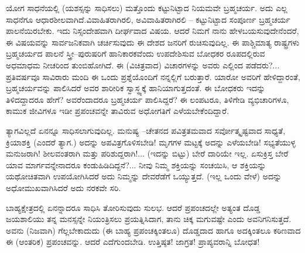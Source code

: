 ಯೋಗ ಸಾಧನೆಯಲ್ಲಿ (ಯಶಸ್ಸನ್ನು ಸಾಧಿಸಲು) ಮತ್ತೊಂದು ಕಟ್ಟುನಿಟ್ಟಾದ ನಿಯಮವೇ ಬ್ರಹ್ಮಚರ್ಯ. ಅದು ಎಲ್ಲ ಸಾಧನೆಗೂ ಆಧಾರಶೀಲವಾಗಿದೆ.\break ವಿವಾಹಿತರಾಗಿರಲಿ, ಅವಿವಾಹಿತರಾಗಿರಲಿ – ಕಟ್ಟುನಿಟ್ಟಾದ ಸಂಪೂರ್ಣ ಬ್ರಹ್ಮಚರ್ಯ ಪಾಲನೆಯಿರಬೇಕು. ಇದು ನಿಸ್ಸಂದೇಹವಾಗಿ ದೀರ್ಘವಾದ ವಿಷಯ. ಆದರೆ ನಿಮಗೆ ನಾನು ಹೇಳಬಯಸುವುದೇನೆಂದರೆ, ಈ ವಿಷಯವನ್ನು ಸಾರ್ವಜನಿಕವಾಗಿ ಚರ್ಚಿಸುವುದು ಈ ದೇಶದ ಜನರಿಗೆ ರುಚಿಸುವುದಿಲ್ಲ. ಈ ಪಾಶ್ಚಿಮಾತ್ಯ ರಾಷ್ಟ್ರಗಳು ಬ್ರಹ್ಮಚರ್ಯದ ಪಾಲನೆ ಸ್ತ್ರೀ–ಪುರುಷರಿಗೆ ಹಾನಿಕಾರಕವೆಂದು ಉಪದೇಶಿಸುವ ಬೋಧಕರ ರೂಪದಲ್ಲಿರುವ ಅಧಮಾಧಮ ನೀಚರಿಂದ ತುಂಬಿಹೋಗಿದೆ. ಈ (ವಿಚಿತ್ರವಾದ) ವಿಚಾರಗಳನ್ನು ಅವರು ಎಲ್ಲಿಂದ ಪಡೆದರು?... ಪ್ರತಿವರ್ಷವೂ ಸಾವಿರಾರು ಮಂದಿ ಈ ಒಂದು ಪ್ರಶ್ನೆಯೊಂದಿಗೆ ನನ್ನಲ್ಲಿಗೆ ಬರುತ್ತಾರೆ. ಯಾರೋ ಅವರಿಗೆ ಹೇಳಿದ್ದಾರಂತೆ, ಬ್ರಹ್ಮಚರ್ಯವನ್ನು ಪಾಲಿಸಿದರೆ ಅವರ ಶಾರೀರಿಕ ಸ್ವಾಸ್ಥ್ಯಕ್ಕೆ ಹಾನಿಯಾಗುತ್ತದಂತೆ. ಈ ಬೋಧಕರು ಇದನ್ನು ತಿಳಿದದ್ದಾದರೂ ಹೇಗೆ? ಅವರೆಂದಾದರೂ ಬ್ರಹ್ಮಚರ್ಯ ಪಾಲಿಸಿದ್ದರೆ? ಈ ಲಂಪಟರೂ, ತಿಳಿಗೇಡಿ ವ್ಯಭಿಚಾರಿಗಳೂ, ಕಾಮುಕ ಜೀವಿಗಳೂ ಇಡೀ ಪ್ರಪಂಚವನ್ನೇ ತಾವಿರುವ ಅಧೋಗತಿಗೆ ಎಳೆಯಬೇಕೆಂದಿದ್ದಾರೆ.

ತ್ಯಾಗವಿಲ್ಲದೆ ಏನನ್ನೂ ಸಾಧಿಸಲಾಗುವುದಿಲ್ಲ. ಮನುಷ್ಯ –ಚೇತನದ ಪವಿತ್ರತಮವಾದ ಸರ್ವೋತ್ಕೃಷ್ಟವಾದ ಸಾಧ್ಯತೆ, ಕ್ರಿಯಾಶಕ್ತಿ (ಎಂದರೆ ತ್ಯಾಗ.) ಅದನ್ನು ಅಪವಿತ್ರಗೊಳಿಸಬೇಡಿ! ಮೃಗಗಳ ಮಟ್ಟಕ್ಕೆ ಅದನ್ನು ಎಳೆಯಬೇಡಿ! ಸಭ್ಯತೆಯುಳ್ಳ ಮನುಜರಾಗಿ! ಶೀಲವಂತರಾಗಿ ಮತ್ತು ಪರಿಶುದ್ದರಾಗಿ!... (ಇದನ್ನು ಬಿಟ್ಟು) ಬೇರೆ ದಾರಿಯೇ ಇಲ್ಲ. ಏಸುಕ್ರಿಸ್ತ ಬೇರೆ ಯಾವ ಮಾರ್ಗವನ್ನೇನಾದರೂ ಕಂಡುಹಿಡಿದಿದ್ದನೆ?... ನೀವು ನಿಮ್ಮ ಶಕ್ತಿಯನ್ನು ಸಂಚಯಿಸಿ, ಆ ಶಕ್ತಿಯನ್ನು ಯಥೋಚಿತವಾಗಿ ಉಪಯೋಗಿಸಿದರೆ ಅದು ನಿಮ್ಮನ್ನು ದೇವರೆಡೆಗೆ ಒಯ್ಯುತ್ತದೆ. (ಇಲ್ಲ ಒಂದು ವೇಳೆ) ಅದನ್ನು ಅಧೋಮುಖವಾಗಿಸಿದರೆ ಅದು ನರಕವೇ ಸರಿ.

ಬಾಹ್ಯಕ್ಷೇತ್ರದಲ್ಲಿ ಏನನ್ನಾದರೂ ಸಾಧಿಸಿ ತೋರಿಸುವುದು ಸುಲಭ. ಆದರೆ ಪ್ರಪಂಚದಲ್ಲೇ ಅತ್ಯಂತ ದೊಡ್ಡ ಜಯಶಾಲಿಯು ತನ್ನ ಮನಸ್ಸನ್ನೇ ನಿಯಂತ್ರಿಸಲು ಪ್ರಯತ್ನಿಸಿದಾಗ, ತಾನು ಚಿಕ್ಕ ಮಗುವಷ್ಟೇ ಎಂದು ಅವನಿಗನಿಸುತ್ತದೆ. ಅವನು (ನಿಜವಾಗಿ) ಗೆಲ್ಲಬೇಕಾದುದು (ಈ ಬಾಹ್ಯ ಪ್ರಪಂಚಕ್ಕಿಂತಲೂ) ದೊಡ್ಡದಾದ ಹಾಗೂ ಅದಕ್ಕಿಂತಲೂ ಕಠಿಣವಾದ ಈ (ಆಂತರಿಕ) ಪ್ರಪಂಚವನ್ನು. ಆದರೆ ಎದೆಗುಂದಬೇಡಿ. ಉತ್ತಿಷ್ಠತ! ಜಾಗ್ರತ! ಪ್ರಾಪ್ಯವರಾನ್ನಿ ಬೋಧತ!

